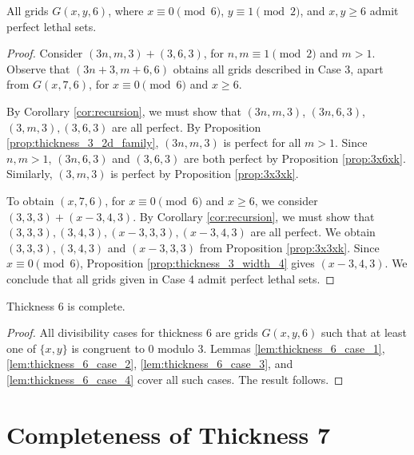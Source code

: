 \begin{lem}
\label{lem:thickness_6_case_4}
All grids $G(x,y,6)$, where $x \equiv 0 \pmod 6$, $y \equiv 1 \pmod 2$, and $x,y \geq 6$ admit perfect lethal sets.
\end{lem}

\begin{proof}
Consider $(3n,m,3) + (3,6,3)$, for $n,m \equiv 1 \pmod 2$ and $m > 1$. Observe that $(3n+3,m+6,6)$ obtains all grids described in Case 3, apart from $G(x,7,6)$, for $x \equiv 0 \pmod 6$ and $x \geq 6$. 

By Corollary \ref{cor:recursion}, we must show that $(3n,m,3)$, $(3n,6,3)$, $(3,m,3), (3,6,3)$ are all perfect. By Proposition \ref{prop:thickness_3_2d_family}, $(3n,m,3)$ is perfect for all $m > 1$. Since $n,m > 1$, $(3n,6,3)$ and $(3,6,3)$ are both perfect by Proposition \ref{prop:3x6xk}. Similarly, $(3,m,3)$ is perfect by Proposition \ref{prop:3x3xk}.

To obtain $(x,7,6)$, for $x \equiv 0 \pmod 6$ and $x \geq 6$, we consider $(3,3,3) + (x-3, 4,3)$. By Corollary \ref{cor:recursion}, we must show that $(3,3,3), (3,4,3), (x-3,3,3), (x-3,4,3)$ are all perfect. We obtain $(3,3,3), (3,4,3)$ and $(x-3,3,3)$ from Proposition \ref{prop:3x3xk}. Since $x \equiv 0 \pmod 6$, Proposition \ref{prop:thickness_3_width_4} gives $(x-3,4,3)$. We conclude that all grids given in Case 4 admit perfect lethal sets. 
\end{proof}

\begin{lem}
\label{lem:thickness_6_complete}
Thickness 6 is complete.
\end{lem}

\begin{proof}
All divisibility cases for thickness 6 are grids $G(x,y,6)$ such that at least one of $\{x,y\}$ is congruent to 0 modulo 3. Lemmas \ref{lem:thickness_6_case_1}, \ref{lem:thickness_6_case_2}, \ref{lem:thickness_6_case_3}, and \ref{lem:thickness_6_case_4} cover all such cases. The result follows.
\end{proof}

\section{Completeness of Thickness 7}

